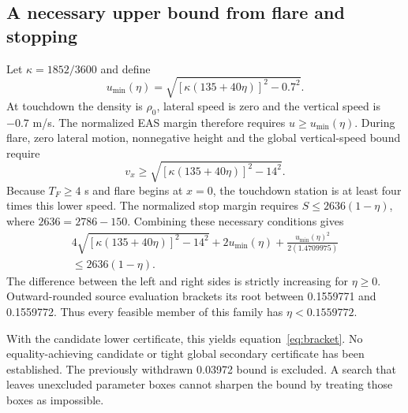 \subsection{A necessary upper bound from flare and stopping}
Let $\kappa=1852/3600$ and define
\begin{equation}
u_{\min}(\eta)=\sqrt{[\kappa(135+40\eta)]^2-0.7^2}.
\end{equation}
At touchdown the density is $\rho_0$, lateral speed is zero and the vertical speed is $-0.7$ m/s. The normalized EAS margin therefore requires $u\geq u_{\min}(\eta)$. During flare, zero lateral motion, nonnegative height and the global vertical-speed bound require
\begin{equation}
v_x\geq\sqrt{[\kappa(135+40\eta)]^2-14^2}.
\end{equation}
Because $T_F\geq4$ s and flare begins at $x=0$, the touchdown station is at least four times this lower speed. The normalized stop margin requires $S\leq2636(1-\eta)$, where $2636=2786-150$. Combining these necessary conditions gives
\begin{multline}
4\sqrt{[\kappa(135+40\eta)]^2-14^2}
+2u_{\min}(\eta)+\frac{u_{\min}(\eta)^2}{2(1.4709975)}\\
\leq2636(1-\eta).
\end{multline}
The difference between the left and right sides is strictly increasing for $\eta\geq0$. Outward-rounded source evaluation brackets its root between 0.1559771 and 0.1559772. Thus every feasible member of this family has $\eta<0.1559772$.

With the candidate lower certificate, this yields equation~\eqref{eq:bracket}. No equality-achieving candidate or tight global secondary certificate has been established. The previously withdrawn 0.03972 bound is excluded. A search that leaves unexcluded parameter boxes cannot sharpen the bound by treating those boxes as impossible.

